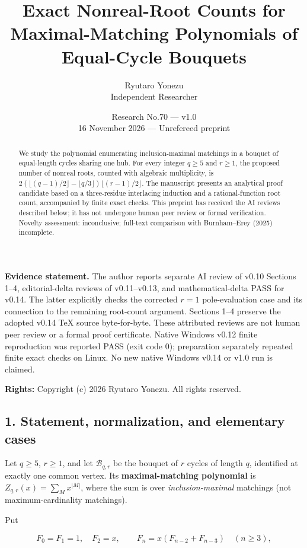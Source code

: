 \documentclass[
  10pt,
]{article}
\title{\Large\bfseries Exact Nonreal-Root Counts for Maximal-Matching Polynomials of Equal-Cycle Bouquets}
\author{Ryutaro Yonezu\\\small Independent Researcher}
\date{\small Research No.70 --- v1.0\\16 November 2026 --- Unrefereed preprint}
\begin{document}
\maketitle
\begin{abstract}
We study the polynomial enumerating inclusion-maximal matchings in a bouquet of equal-length cycles sharing one hub. For every integer \(q\ge5\) and \(r\ge1\), the proposed number of nonreal roots, counted with algebraic multiplicity, is \(2(\lfloor(q-1)/2\rfloor-\lfloor q/3\rfloor)\lfloor(r-1)/2\rfloor\). The manuscript presents an analytical proof candidate based on a three-residue interlacing induction and a rational-function root count, accompanied by finite exact checks. This preprint has received the AI reviews described below; it has not undergone human peer review or formal verification. Novelty assessment: inconclusive; full-text comparison with Burnham--Erey (2025) incomplete.
\end{abstract}

\textbf{Evidence statement.} The author reports separate AI review of v0.10 Sections 1--4, editorial-delta reviews of v0.11--v0.13, and mathematical-delta PASS for v0.14. The latter explicitly checks the corrected \(r=1\) pole-evaluation case and its connection to the remaining root-count argument. Sections 1--4 preserve the adopted v0.14 TeX source byte-for-byte. These attributed reviews are not human peer review or a formal proof certificate. Native Windows v0.12 finite reproduction was reported PASS (exit code 0); preparation separately repeated finite exact checks on Linux. No new native Windows v0.14 or v1.0 run is claimed.

\textbf{Rights:} Copyright (c) 2026 Ryutaro Yonezu. All rights reserved.

\subsection{1. Statement, normalization, and elementary
cases}\label{statement-normalization-and-elementary-cases}

Let \(q\ge5\), \(r\ge1\), and let \(\mathcal B_{q,r}\) be the bouquet of
\(r\) cycles of length \(q\), identified at exactly one common vertex.
Its \textbf{maximal-matching polynomial} is
\(Z_{q,r}(x)=\sum_M x^{|M|}\), where the sum is over
\emph{inclusion-maximal} matchings (not maximum-cardinality matchings).

Put

\[
 F_0=F_1=1,\quad F_2=x,\qquad F_n=x(F_{n-2}+F_{n-3})\quad(n\ge3),
\]
\end{document}
